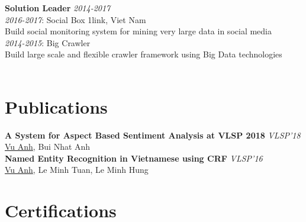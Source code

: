 \documentclass[11pt,a4paper,roman]{article}
\begin{document}
\noindent
\textbf{Solution Leader}
\hfill
\textit{2014-2017} \\
\textit{2016-2017}: Social Box
\hfill
1link, Viet Nam
\\
Build social monitoring system for mining very large data in social media
\\
\textit{2014-2015}: Big Crawler\\
Build large scale and flexible crawler framework using Big Data technologies
\\
\\


\section{Publications}

\textbf{A System for Aspect Based Sentiment Analysis at VLSP 2018}
\hfill
\textit{VLSP'18} \\
\underline{Vu Anh}, Bui Nhat Anh
\\

\noindent
\textbf{Named Entity Recognition in Vietnamese using CRF}
\hfill
\textit{VLSP'16} \\
\underline{Vu Anh}, Le Minh Tuan, Le Minh Hung

\section{Certifications}
\end{document}
